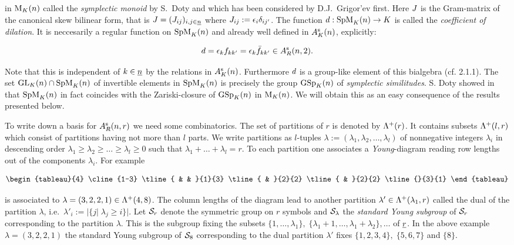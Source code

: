 \documentclass[twoside,12pt]{article}
\begin{document}
in $\gmhg nK$ called the {\em symplectic monoid} by S.\ Doty
\cite{doty} and which has been  
considered by D.J.\ Grigor'ev \cite{grig} first.
Here $\spT$ is the Gram-matrix of the canonical
skew bilinear form, that is $\spT=(\spT_{ij})_{i,j \in \mg n}$ where
$\spT_{ij}:=\epsilon_i\delta_{ij'}$. The function $\spq :\gspm nK \pfr K$ is
called the {\em coefficient of dilation}. It is neccesarily a
regular function on $\gspm nK$ and already 
well defined in $\sAn{K}$, explicitly:

\begin{equation}\label{formel d}
\spq = \epsilon_k f_{kk'}=
\epsilon_k\bar f_{kk'}
\in \rsAn{\gr} 2.
\end{equation}

Note that this is independent of $k\in \mg n$ by the relations in $\sAn K$.
Furthermore $\spq$ is a group-like element of this bialgebra
(cf. \cite{doc} 2.1.1). The set $\gln nK \cap \gspm nK$ 
of invertible elements in $\gspm nK$
is precisely the group $\gsp nK$
of {\em symplectic similitudes}. S. Doty showed in \cite{doty} that
$\gspm nK$  in fact coincides with the Zariski-closure of $\gsp nK$ in
$\gmhg nK$. We will obtain this as an easy consequence of the results
presented below.\Ab

To write down a basis for $\rsAn{\gr} r$ we need some combinatorics.
The set of partitions of $r$ is denoted by $\rprt r$. It contains 
subsets $\prt lr$ which consist of partitions having not more than $l$ parts.
We write partitions as $l$-tuples
$\lambda :=(\lambda_1, \lambda_2, \ldots , \lambda_l)$
of nonnegative integers $\lambda_i$ in descending order
$\lambda_1\geq \lambda_2 \geq \ldots \geq \lambda_l\geq 0$ such that
$\lambda_1 +\ldots +\lambda_l=r$. To each partition one
associates a {\em Young}-diagram reading row lengths out of the
components $\lambda_i$. For example

\[ \begin{tableau}{4} \cline{1-3}
\tline{ & & }{1}{3}
\tline{ & }{2}{2}
\tline{ & }{2}{2}
\tline{}{3}{1}
\end{tableau}
\]


is associated to $\lambda=(3,2,2,1) \in \prt 48$. The column lengths
of the diagram lead to another partition $\lambda'\in
\prt{\lambda_1}{r}$ called the dual of the partition $\lambda$, i.e.\
$\lambda'_i:=|\{j|\; \lambda_j \geq i\}|$.
Let $\symg r$ denote the symmetric group on $r$ symbols and
$\symg{\lambda}$ the {\em standard Young subgroup} of $\symg r$
corresponding to the partition $\lambda$. This is the subgroup fixing
the subsets
$\{1, \ldots , \lambda_1 \}, \; \{\lambda_1+1, \ldots , \lambda_1+\lambda_2\},
\ldots $ of $\mg r$. In the above example $\lambda=(3,2,2,1)$ the
standard Young subgroup of $\symg 8$ corresponding to the dual
partition $\lambda'$ fixes $\{1,2,3,4\},\;\{5,6,7\}$ and $\{8\}$.\Ab
\end{document}

